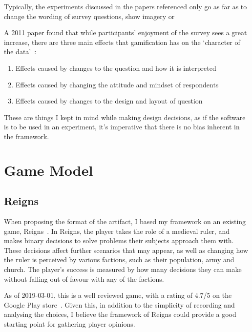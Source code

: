 Typically, the experiments discussed in the papers referenced only go as far as to change the wording of survey questions, show imagery or 

A 2011 paper found that while participants' enjoyment of the survey sees a great increase, there are three main effects that gamification has on the `character of the data'~\cite{GameExperiments}:
\begin{enumerate}
    \item Effects caused by changes to the question and how it is interpreted
    \item Effects caused by changing the attitude and mindset of respondents
    \item Effects caused by changes to the design and layout of question
\end{enumerate}
These are things I kept in mind while making design decisions, as if the software is to be used in an experiment, it's imperative that there is no bias inherent in the framework.

\section{Game Model}
\subsection{Reigns}
When proposing the format of the artifact, I based my framework on an existing game, Reigns~\cite{Reigns}. 
In Reigns, the player takes the role of a medieval ruler, and makes binary decisions to solve problems their subjects approach them with. 
These decisions affect further scenarios that may appear, as well as changing how the ruler is perceived by various factions, such as their population, army and church. 
The player's success is measured by how many decisions they can make without falling out of favour with any of the factions.

As of 2019-03-01, this is a well reviewed game, with a rating of 4.7/5 on the Google Play store~\cite{GooglePlay}. 
Given this, in addition to the simplicity of recording and analysing the choices, I believe the framework of Reigns could provide a good starting point for gathering player opinions. 
